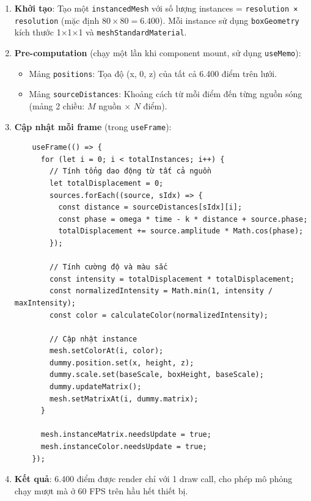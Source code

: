 \begin{enumerate}
    \item \textbf{Khởi tạo}: Tạo một \texttt{instancedMesh} với số lượng instances = \texttt{resolution × resolution} (mặc định $80 \times 80 = 6.400$). Mỗi instance sử dụng \texttt{boxGeometry} kích thước 1×1×1 và \texttt{meshStandardMaterial}.
    
    \item \textbf{Pre-computation} (chạy một lần khi component mount, sử dụng \texttt{useMemo}):
    \begin{itemize}
        \item Mảng \texttt{positions}: Tọa độ (x, 0, z) của tất cả 6.400 điểm trên lưới.
        \item Mảng \texttt{sourceDistances}: Khoảng cách từ mỗi điểm đến từng nguồn sóng (mảng 2 chiều: $M$ nguồn × $N$ điểm).
    \end{itemize}
    
    \item \textbf{Cập nhật mỗi frame} (trong \texttt{useFrame}):
    \begin{verbatim}
    useFrame(() => {
      for (let i = 0; i < totalInstances; i++) {
        // Tính tổng dao động từ tất cả nguồn
        let totalDisplacement = 0;
        sources.forEach((source, sIdx) => {
          const distance = sourceDistances[sIdx][i];
          const phase = omega * time - k * distance + source.phase;
          totalDisplacement += source.amplitude * Math.cos(phase);
        });
        
        // Tính cường độ và màu sắc
        const intensity = totalDisplacement * totalDisplacement;
        const normalizedIntensity = Math.min(1, intensity / maxIntensity);
        const color = calculateColor(normalizedIntensity);
        
        // Cập nhật instance
        mesh.setColorAt(i, color);
        dummy.position.set(x, height, z);
        dummy.scale.set(baseScale, boxHeight, baseScale);
        dummy.updateMatrix();
        mesh.setMatrixAt(i, dummy.matrix);
      }
      
      mesh.instanceMatrix.needsUpdate = true;
      mesh.instanceColor.needsUpdate = true;
    });
    \end{verbatim}
    
    \item \textbf{Kết quả}: 6.400 điểm được render chỉ với 1 draw call, cho phép mô phỏng chạy mượt mà ở 60 FPS trên hầu hết thiết bị.
\end{enumerate}

